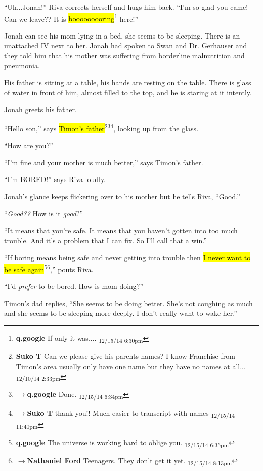 ``Uh...Jonah!'' Riva corrects herself and hugs him back.  ``I'm so glad you came!  Can we leave??  It is \hl{booooooooring}\footnote{\textbf{q.google }If only it was.... \textsubscript{12/15/14 6:30pm}} here!''

Jonah can see his mom lying in a bed, she seems to be sleeping.  There is an unattached IV next to her.  Jonah had spoken to Swan and Dr. Gerhauser and they told him that his mother was suffering from borderline malnutrition and pneumonia.

His father is sitting at a table, his hands are resting on the table.  There is glass of water in front of him, almost filled to the top, and he is staring at it intently.

Jonah greets his father. 

``Hello son,'' says \hl{Timon's father}\footnote{\textbf{Suko T }Can we please give his parents names? I know Franchise from Timon's area usually only have one name but they have no names at all... \textsubscript{12/10/14 2:33pm}}\footnote{$\rightarrow$\textbf{q.google }Done. \textsubscript{12/15/14 6:34pm}}\footnote{$\rightarrow$\textbf{Suko T }thank you!!  Much easier to transcript with names \textsubscript{12/15/14 11:40pm}}, looking up from the glass.  

``How are you?''

``I'm fine and your mother is much better,'' says Timon's father.

``I'm BORED!'' says Riva loudly.

Jonah's glance keeps flickering over to his mother but he tells Riva, ``Good.''

``\textit{Good??}  How is it \textit{good}?''

``It means that you're safe.  It means that you haven't gotten into too much trouble.  And it's a problem that I can fix.  So I'll call that a win.''

``If boring means being safe and never getting into trouble then \hl{I never want to be safe again}\footnote{\textbf{q.google }The universe is working hard to oblige you. \textsubscript{12/15/14 6:35pm}}\footnote{$\rightarrow$\textbf{Nathaniel Ford }Teenagers. They don't get it yet. \textsubscript{12/15/14 8:13pm}},'' pouts Riva.

``I'd \textit{prefer} to be bored.  How is mom doing?''

Timon's dad replies, ``She seems to be doing better. She's not coughing as much and she seems to be sleeping more deeply.   I don't really want to wake her.''


